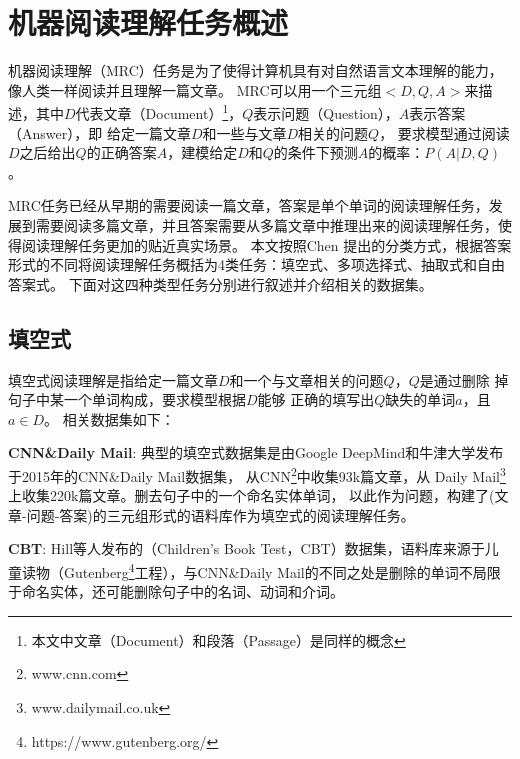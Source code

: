 \section{机器阅读理解任务概述}

机器阅读理解（MRC）任务是为了使得计算机具有对自然语言文本理解的能力，像人类一样阅读并且理解一篇文章。
MRC可以用一个三元组$<D,Q,A>$来描述，其中$D$代表文章（Document）\footnote{本文中文章（Document）和段落（Passage）是同样的概念}，$Q$表示问题（Question），$A$表示答案（Answer），即
给定一篇文章$D$和一些与文章$D$相关的问题$Q$，
要求模型通过阅读$D$之后给出$Q$的正确答案$A$，建模给定$D$和$Q$的条件下预测$A$的概率：$P(A|D,Q)$
。

MRC任务已经从早期的需要阅读一篇文章，答案是单个单词的阅读理解任务，发展到需要阅读多篇文章，并且答案需要从多篇文章中推理出来的阅读理解任务，使得阅读理解任务更加的贴近真实场景。
本文按照Chen
提出的分类方式，根据答案形式的不同将阅读理解任务概括为4类任务：填空式、多项选择式、抽取式和自由答案式。
下面对这四种类型任务分别进行叙述并介绍相关的数据集。



\subsection{填空式}
填空式阅读理解是指给定一篇文章$D$和一个与文章相关的问题$Q$，$Q$是通过删除
掉句子中某一个单词构成，要求模型根据$D$能够
正确的填写出$Q$缺失的单词$a$，且$a\in D$。
相关数据集如下：

\textbf{CNN\&Daily Mail}: \quad 典型的填空式数据集是由Google DeepMind和牛津大学发布于2015年的CNN\&Daily Mail数据集，
从CNN\footnote{www.cnn.com\label{cnn}}中收集93k篇文章，从
Daily Mail\footnote{www.dailymail.co.uk\label{daily mail}}上收集220k篇文章。删去句子中的一个命名实体单词，
以此作为问题，构建了(文章-问题-答案)的三元组形式的语料库作为填空式的阅读理解任务。

\textbf{CBT}: \quad 
Hill等人发布的（Children's Book Test，CBT）数据集，语料库来源于儿童读物（Gutenberg\footnote{https://www.gutenberg.org/\label{cbt}}工程），与CNN\&Daily Mail的不同之处是删除的单词不局限于命名实体，还可能删除句子中的名词、动词和介词。


